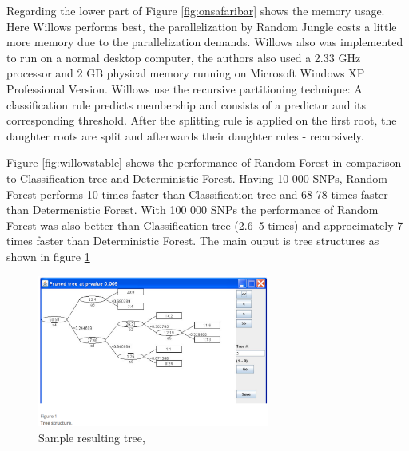\documentclass{sig-alternate-05-2015}
\begin{document}
Regarding the lower part of Figure \ref{fig:onsafaribar} shows the memory usage.
Here Willows performs best, the parallelization by Random Jungle costs a little more memory due to the parallelization demands. Willows also was implemented to run on a normal desktop computer, the authors also used a 2.33 GHz processor and 2 GB physical memory running on Microsoft Windows XP Professional Version. Willows use the recursive partitioning technique: A classification rule predicts membership and consists of a predictor and its corresponding threshold. After the splitting rule is applied on the first root, the daughter roots are split and afterwards their daughter rules - recursively.

Figure \ref{fig:willowstable} shows the performance of Random Forest in comparison to Classification tree and Deterministic Forest. Having 10 000 SNPs, Random Forest performs 10 times faster than Classification tree and 68-78 times faster than Determenistic Forest. With 100 000 SNPs the performance of Random Forest was also better than Classification tree (2.6--5 times) and approcimately 7 times faster than Deterministic Forest.
The main ouput is tree structures as shown in figure \ref{fig:willowstree}

\begin{figure}
\centering
\includegraphics[width=3in]{willowstree}
\caption{Sample resulting tree, \cite{zhang2009willows}}
\label{fig:willowstree}
\end{figure}
\end{document}
